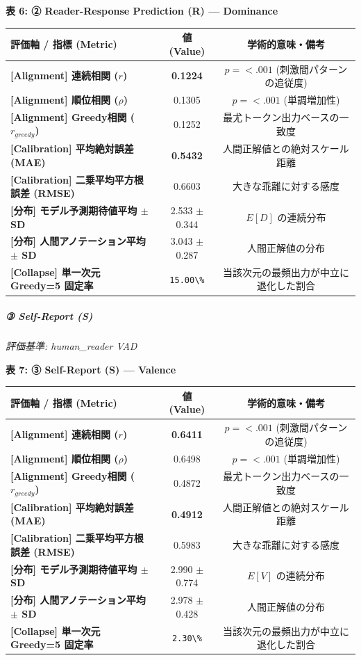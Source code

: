 \textbf{表 6: ② Reader-Response Prediction (R) — Dominance}
\begin{center}
\small
\begin{tabular}{lcc}
\toprule
\textbf{評価軸 / 指標 (Metric)} & \textbf{値 (Value)} & \textbf{学術的意味・備考} \\
\midrule
\textbf{[Alignment] 連続相関 ($r$)} & \textbf{0.1224} & $p = <.001 $ (刺激間パターンの追従度) \\
\textbf{[Alignment] 順位相関 ($\rho$)} & 0.1305 & $p = <.001 $ (単調増加性) \\
\textbf{[Alignment] Greedy相関 ($r_{greedy}$)} & 0.1252 & 最尤トークン出力ベースの一致度 \\
\textbf{[Calibration] 平均絶対誤差 (MAE)} & \textbf{0.5432} & 人間正解値との絶対スケール距離 \\
\textbf{[Calibration] 二乗平均平方根誤差 (RMSE)} & 0.6603 & 大きな乖離に対する感度 \\
\textbf{[分布] モデル予測期待値平均 $\pm$ SD} & 2.533 $\pm$ 0.344 & $E[D]$ の連続分布 \\
\textbf{[分布] 人間アノテーション平均 $\pm$ SD} & 3.043 $\pm$ 0.287 & 人間正解値の分布 \\
\textbf{[Collapse] 単一次元 Greedy=5 固定率} & \texttt{15.00\textbackslash{}\%} & 当該次元の最頻出力が中立に退化した割合 \\
\bottomrule
\end{tabular}
\end{center}


\subparagraph{③ Self-Report (S)}
\textit{評価基準: human\_reader VAD}

\textbf{表 7: ③ Self-Report (S) — Valence}
\begin{center}
\small
\begin{tabular}{lcc}
\toprule
\textbf{評価軸 / 指標 (Metric)} & \textbf{値 (Value)} & \textbf{学術的意味・備考} \\
\midrule
\textbf{[Alignment] 連続相関 ($r$)} & \textbf{0.6411} & $p = <.001 $ (刺激間パターンの追従度) \\
\textbf{[Alignment] 順位相関 ($\rho$)} & 0.6498 & $p = <.001 $ (単調増加性) \\
\textbf{[Alignment] Greedy相関 ($r_{greedy}$)} & 0.4872 & 最尤トークン出力ベースの一致度 \\
\textbf{[Calibration] 平均絶対誤差 (MAE)} & \textbf{0.4912} & 人間正解値との絶対スケール距離 \\
\textbf{[Calibration] 二乗平均平方根誤差 (RMSE)} & 0.5983 & 大きな乖離に対する感度 \\
\textbf{[分布] モデル予測期待値平均 $\pm$ SD} & 2.990 $\pm$ 0.774 & $E[V]$ の連続分布 \\
\textbf{[分布] 人間アノテーション平均 $\pm$ SD} & 2.978 $\pm$ 0.428 & 人間正解値の分布 \\
\textbf{[Collapse] 単一次元 Greedy=5 固定率} & \texttt{2.30\textbackslash{}\%} & 当該次元の最頻出力が中立に退化した割合 \\
\bottomrule
\end{tabular}
\end{center}


